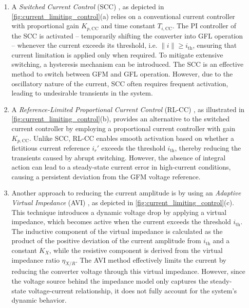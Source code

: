 \documentclass[lettersize,journal]{IEEEtran}
\begin{document}
\begin{enumerate}[label=\alph*)]
   \item A \textit{Switched Current Control} (SCC) \cite{ndreko2018gfm_paper}, as depicted in \cref{fig:current_limiting_control}(a) relies on a conventional current controller with proportional gain $K_{p,\text{CC}}$ and time constant $T_{i,\text{CC}}$.
   The PI controller of the SCC is activated -- temporarily shifting the converter into GFL operation -- whenever the current exceeds its threshold, i.e. $\| i \| \geq i_\text{th}$, ensuring that current limitation is applied only when required.
   To mitigate extensive switching, a hysteresis mechanism can be introduced.
   The SCC is an effective method to switch between GFM and GFL operation.
   However, due to the oscillatory nature of the current, SCC often requires frequent activation, leading to undesirable transients in the system.
   \item A \textit{Reference-Limited Proportional Current Control} (RL-CC) \cite{wu2024design}, as illustrated in \cref{fig:current_limiting_control}(b), provides an alternative to the switched current controller by employing a proportional current controller with gain $K_{p,\text{CC}}$.
   Unlike SCC, RL-CC enables smooth activation based on whether a fictitious current reference $i_r'$ exceeds the threshold $i_\text{th}$, thereby reducing the transients caused by abrupt switching.
   However, the absence of integral action can lead to a steady-state current error in high-current conditions, causing a persistent deviation from the GFM voltage reference.
   \item Another approach to reducing the current amplitude is by using an \textit{Adaptive Virtual Impedance} (AVI) \cite{wu2021small}, as depicted in \cref{fig:current_limiting_control}(c).
   This technique introduces a dynamic voltage drop by applying a virtual impedance, which becomes active when the current exceeds the threshold $i_\text{th}$. 
   The inductive component of the virtual impedance is calculated as the product of the positive deviation of the current amplitude from $i_\text{th}$ and a constant $K_X$, while the resistive component is derived from the virtual impedance ratio $\eta_{X/R}$.
   The AVI method effectively limits the current by reducing the converter voltage through this virtual impedance. However, since the voltage source behind the impedance model only captures the steady-state voltage-current relationship, it does not fully account for the system's dynamic behavior.
\end{enumerate}
\end{document}
